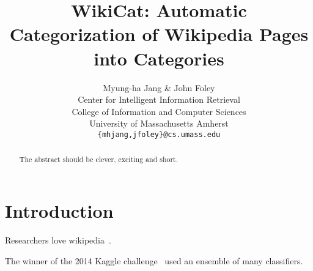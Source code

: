 \documentclass{article} %
\title{WikiCat: Automatic Categorization of Wikipedia Pages into Categories}
\author{Myung-ha Jang \& John Foley\\
  Center for Intelligent Information Retrieval\\
College of Information and Computer Sciences\\
University of Massachusetts Amherst\\
\texttt{\{mhjang,jfoley\}@cs.umass.edu}
}
\begin{document}
\maketitle

\begin{abstract}
The abstract should be clever, exciting and short.
\end{abstract}

\section{Introduction}
Researchers love wikipedia~\cite{wang2014concept,banerjee07,gabrilovich2007computing,meij2012adding,de2014taxonomic, pohl2012classifying}.

The winner of the 2014 Kaggle challenge~\cite{puurula2014kaggle} used an ensemble of many classifiers.


\small
\end{document}
